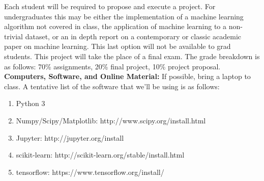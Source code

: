 \documentclass[11pt]{article}
\begin{document}
Each student will be required to propose and execute a project.  For undergraduates this may be either the implementation of a machine learning algorithm not covered in class, the application of machine learning to a non-trivial dataset, or an in depth report on a contemporary or classic academic paper on machine learning.  This last option will not be available to grad students.  This project will take the place of a final exam.  The grade breakdown is as follows: 70\% assignments, 20\% final project, 10\% project proposal.   
\vspace{5mm}\\
\textbf{\large Computers, Software, and Online Material:}
If possible, bring a laptop to class.  A tentative list of the software that we'll be using is as follows:
\begin{enumerate}
\item Python 3
\item Numpy/Scipy/Matplotlib: http://www.scipy.org/install.html
\item Jupyter: http://jupyter.org/install
\item scikit-learn: http://scikit-learn.org/stable/install.html
\item tensorflow: https://www.tensorflow.org/install/
\end{enumerate}
\end{document}
